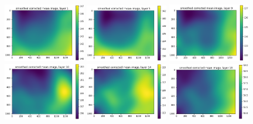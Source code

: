\documentclass[letterpaper,11pt]{article}
\begin{document}
\begin{figure}[!ht]
\centering
\includegraphics[width=0.32\textwidth]{images/results/unmasked_smoothed_corrected_mean_image_layers/unmasked_smoothed_corrected_mean_image_layer_1}
\includegraphics[width=0.32\textwidth]{images/results/unmasked_smoothed_corrected_mean_image_layers/unmasked_smoothed_corrected_mean_image_layer_5}
\includegraphics[width=0.32\textwidth]{images/results/unmasked_smoothed_corrected_mean_image_layers/unmasked_smoothed_corrected_mean_image_layer_9}
\includegraphics[width=0.32\textwidth]{images/results/unmasked_smoothed_corrected_mean_image_layers/unmasked_smoothed_corrected_mean_image_layer_10}
\includegraphics[width=0.32\textwidth]{images/results/unmasked_smoothed_corrected_mean_image_layers/unmasked_smoothed_corrected_mean_image_layer_14}
\includegraphics[width=0.32\textwidth]{images/results/unmasked_smoothed_corrected_mean_image_layers/unmasked_smoothed_corrected_mean_image_layer_18}

\end{figure}
\end{document}
